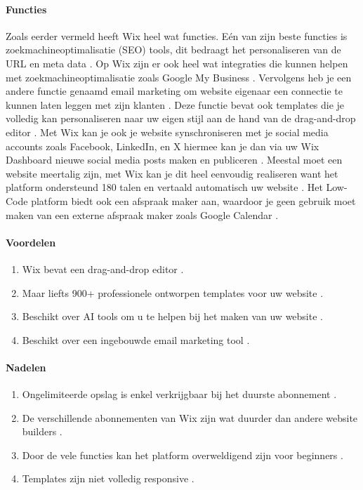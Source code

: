 \paragraph{Functies}
Zoals eerder vermeld heeft Wix heel wat functies. Eén van zijn beste functies is zoekmachineoptimalisatie (SEO) tools, dit bedraagt het personaliseren van de URL en meta data \autocite{Ryan2024}.
Op Wix zijn er ook heel wat integraties die kunnen helpen met zoekmachineoptimalisatie zoals Google My Business \autocite{Ryan2024}. Vervolgens heb je een andere functie genaamd email marketing
om website eigenaar een connectie te kunnen laten leggen met zijn klanten \autocite{Ryan2024}. Deze functie bevat ook templates die je volledig kan personaliseren naar uw eigen stijl aan de hand van de drag-and-drop editor \autocite{Ryan2024}.
Met Wix kan je ook je website synschroniseren met je social media accounts zoals Facebook, LinkedIn, en X hiermee kan je dan via uw Wix Dashboard nieuwe social media posts maken en publiceren \autocite{Ryan2024}.
Meestal moet een website meertalig zijn, met Wix kan je dit heel eenvoudig realiseren want het platform ondersteund 180 talen en vertaald automatisch uw website \autocite{Ryan2024}. Het Low-Code platform biedt ook een afspraak maker aan, waardoor je geen 
gebruik moet maken van een externe afspraak maker zoals Google Calendar \autocite{Singleton2024}. 
\paragraph*{Voordelen}
\begin{enumerate}
    \item Wix bevat een drag-and-drop editor \autocite{Ryan2024}.
    \item Maar liefts 900+ professionele ontworpen templates voor uw website \autocite{Ryan2024} \autocite{Singleton2024}.
    \item Beschikt over AI tools om u te helpen bij het maken van uw website \autocite{Ryan2024}.
    \item Beschikt over een ingebouwde email marketing tool \autocite{Singleton2024}.
\end{enumerate}


\paragraph*{Nadelen}
\begin{enumerate}
    \item Ongelimiteerde opslag is enkel verkrijgbaar bij het duurste abonnement \autocite{Ryan2024}.
    \item De verschillende abonnementen van Wix zijn wat duurder dan andere website builders \autocite{Ryan2024}.
    \item Door de vele functies kan het platform overweldigend zijn voor beginners \autocite{Ryan2024}.
    \item Templates zijn niet volledig responsive \autocite{Singleton2024}.
\end{enumerate}

